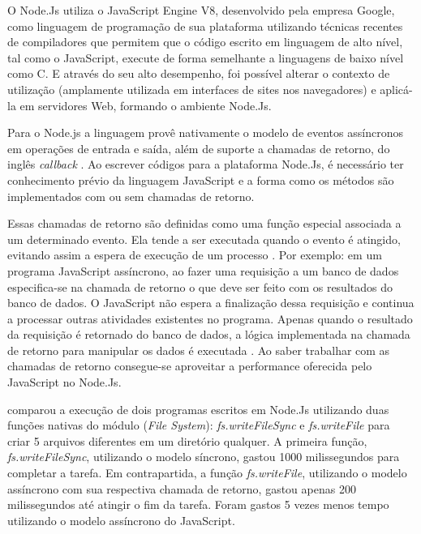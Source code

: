   O Node.Js utiliza o JavaScript Engine V8, desenvolvido pela empresa Google, como linguagem de programação
  de sua plataforma utilizando técnicas recentes de compiladores que permitem que o código escrito em linguagem de alto nível,
  tal como o JavaScript, execute de forma semelhante a linguagens de baixo nível como C.  E através do seu alto desempenho, 
  foi possível alterar o contexto de utilização (amplamente utilizada em interfaces de sites nos navegadores) e aplicá-la em 
  servidores Web, formando o ambiente Node.Js.
  
  
  Para o Node.js a linguagem provê nativamente o modelo de eventos assíncronos em operações de entrada e saída, 
  além de suporte a chamadas de retorno, do inglês \textit{callback} \cite{Oliveira:2012}.  Ao escrever códigos para a 
  plataforma Node.Js, é necessário ter conhecimento prévio da linguagem JavaScript e a forma como os 
  métodos são implementados com ou sem chamadas de retorno. \cite{Hughes:2012}
  
  
  
 

  Essas chamadas de retorno são definidas como uma função especial associada a um determinado evento. Ela tende a ser 
  executada quando o evento é atingido, evitando assim a espera de execução de um processo \cite{Wilson:2013}. Por exemplo:
  em um programa JavaScript assíncrono, ao fazer uma requisição a um banco de dados especifica-se na chamada de retorno o 
  que deve ser feito com os resultados do banco de dados. O JavaScript
  não espera a finalização dessa requisição e continua a processar outras atividades existentes no programa. 
  Apenas quando o resultado da requisição é retornado do banco de dados, a lógica implementada na chamada de retorno 
  para manipular os dados é executada \cite{Junior:2012}. Ao saber trabalhar com as chamadas de retorno consegue-se aproveitar 
  a performance oferecida pelo JavaScript no Node.Js.
  
   comparou a execução de dois programas escritos em Node.Js utilizando duas funções nativas
  do módulo (\textit{File System}): \textit{fs.writeFileSync} e \textit{fs.writeFile} para criar 5 arquivos diferentes 
  em um diretório qualquer. A primeira função, \textit{fs.writeFileSync}, utilizando o modelo síncrono, gastou 1000 milissegundos 
  para completar a tarefa. Em contrapartida, a função \textit{fs.writeFile}, utilizando o modelo assíncrono com sua respectiva 
  chamada de retorno, gastou apenas 200 milissegundos até atingir o fim da tarefa. Foram gastos 5 vezes menos tempo utilizando o 
  modelo assíncrono do JavaScript.
  
